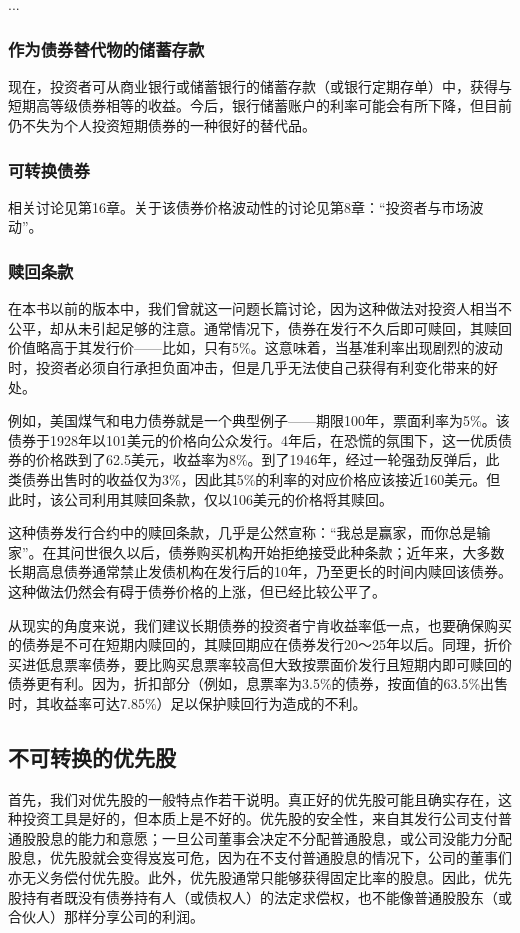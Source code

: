 \documentclass[12pt,oneside]{book}
\begin{document}
...
\subsubsection{作为债券替代物的储蓄存款}
现在，投资者可从商业银行或储蓄银行的储蓄存款（或银行定期存单）中，获得与短期高等级债券相等的收益。今后，银行储蓄账户的利率可能会有所下降，但目前仍不失为个人投资短期债券的一种很好的替代品。

\subsubsection{可转换债券}
相关讨论见第16章。关于该债券价格波动性的讨论见第8章：“投资者与市场波动”。

\subsubsection{赎回条款}
在本书以前的版本中，我们曾就这一问题长篇讨论，因为这种做法对投资人相当不公平，却从未引起足够的注意。通常情况下，债券在发行不久后即可赎回，其赎回价值略高于其发行价——比如，只有5\%。这意味着，当基准利率出现剧烈的波动时，投资者必须自行承担负面冲击，但是几乎无法使自己获得有利变化带来的好处。

例如，美国煤气和电力债券就是一个典型例子——期限100年，票面利率为5\%。该债券于1928年以101美元的价格向公众发行。4年后，在恐慌的氛围下，这一优质债券的价格跌到了62.5美元，收益率为8\%。到了1946年，经过一轮强劲反弹后，此类债券出售时的收益仅为3\%，因此其5\%的利率的对应价格应该接近160美元。但此时，该公司利用其赎回条款，仅以106美元的价格将其赎回。

这种债券发行合约中的赎回条款，几乎是公然宣称：“我总是赢家，而你总是输家”。在其问世很久以后，债券购买机构开始拒绝接受此种条款；近年来，大多数长期高息债券通常禁止发债机构在发行后的10年，乃至更长的时间内赎回该债券。这种做法仍然会有碍于债券价格的上涨，但已经比较公平了。

从现实的角度来说，我们建议长期债券的投资者宁肯收益率低一点，也要确保购买的债券是不可在短期内赎回的，其赎回期应在债券发行20～25年以后。同理，折价买进低息票率债券，要比购买息票率较高但大致按票面价发行且短期内即可赎回的债券更有利。因为，折扣部分（例如，息票率为3.5\%的债券，按面值的63.5\%出售时，其收益率可达7.85\%）足以保护赎回行为造成的不利。

\subsection{不可转换的优先股}
首先，我们对优先股的一般特点作若干说明。真正好的优先股可能且确实存在，这种投资工具是好的，但本质上是不好的。优先股的安全性，来自其发行公司支付普通股股息的能力和意愿；一旦公司董事会决定不分配普通股息，或公司没能力分配股息，优先股就会变得岌岌可危，因为在不支付普通股息的情况下，公司的董事们亦无义务偿付优先股。此外，优先股通常只能够获得固定比率的股息。因此，优先股持有者既没有债券持有人（或债权人）的法定求偿权，也不能像普通股股东（或合伙人）那样分享公司的利润。
\end{document}
